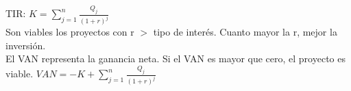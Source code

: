 \documentclass{article}
\begin{document}
TIR: \begin{math} K=\sum_{j=1}^{n} \frac{Q_j}{(1+r)^j}\end{math}
\\
Son viables los proyectos con r $>$ tipo de interés. Cuanto mayor la r, mejor la inversión.\\
El VAN representa la ganancia neta. Si el VAN es mayor que cero, el proyecto es viable.
\begin{math}
VAN = -K + \sum_{j=1}^{n} \frac{Q_j}{(1+r)^j}
\end{math}






\newpage





\end{document}
